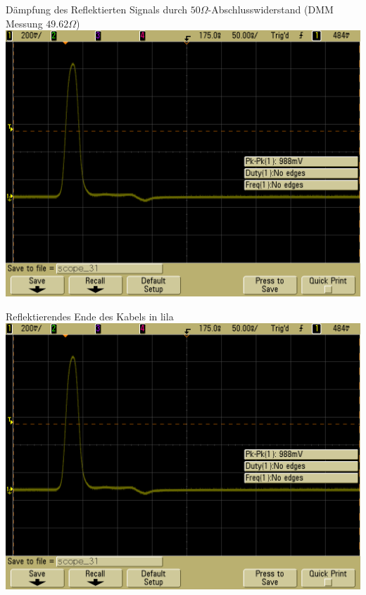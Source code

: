 \documentclass[compress,11pt]{beamer}
\begin{document}
\begin{frame}
\begin{block}{Dämpfung des Reflektierten Signals durch $50\Omega$-Abschlusswiderstand (DMM Messung $49.62\Omega$)}
\centering
\includegraphics[width=.85\textwidth]{../daten/scope_31.png}
\end{block}
\end{frame}
\begin{frame}
\begin{block}{Reflektierendes Ende des Kabels in lila}
\includegraphics[width=.85\textwidth]{../daten/scope_31.png}
\end{block}
\end{frame}
\end{document}
